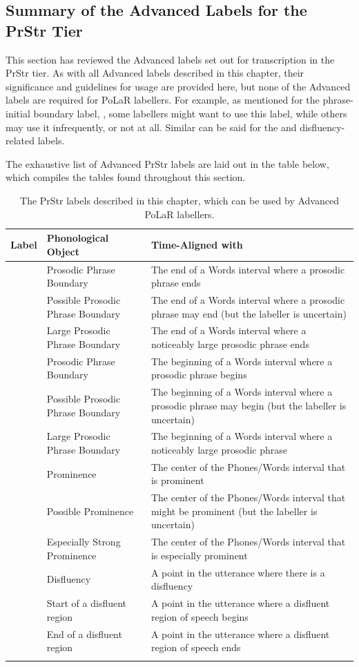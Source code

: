 \documentclass[11pt, twoside]{memoir}
\def\textlabel#1{{\relsize{-.5}\fontspec[Mapping=tex-text]{Roboto Mono}{#1}}}
\begin{document}
\subsection{Summary of the Advanced Labels for the PrStr Tier}
This section has reviewed the Advanced labels set out for transcription in the PrStr tier. As with all Advanced labels described in this chapter, their significance and guidelines for usage are provided here, but none of the Advanced labels are required for PoLaR labellers. For example, as mentioned for the phrase-initial boundary label, \textlabel{[}, some labellers might want to use this label, while others may use it infrequently, or not at all. Similar can be said for the \textlabel{**} and disfluency-related labels.

The exhaustive list of Advanced PrStr labels are laid out in the table below, which compiles the tables found throughout this section.

\begin{longtable}{cp{.3\linewidth}p{.45\linewidth}}
	\toprule
	\textbf{Label} & \textbf{Phonological Object} & \textbf{Time-Aligned with} \tabularnewline
	\midrule
	\endhead
	\rowcolor{green}
	\textlabel{]} & Prosodic Phrase Boundary & The end of a Words interval where a prosodic phrase ends \tabularnewline
	\textlabel{?]} & Possible Prosodic Phrase Boundary & The end of a Words interval where a prosodic phrase may end (but the labeller is uncertain) \tabularnewline
	\textlabel{]]} & Large Prosodic Phrase Boundary & The end of a Words interval where a noticeably large prosodic phrase ends \tabularnewline
	\textlabel{[} & Prosodic Phrase Boundary & The beginning of a Words interval where a prosodic phrase begins \tabularnewline
	\textlabel{?[} & Possible Prosodic Phrase Boundary & The beginning of a Words interval where a prosodic phrase may begin (but the labeller is uncertain) \tabularnewline
	\textlabel{[[} & Large Prosodic Phrase Boundary & The beginning of a Words interval where a noticeably large prosodic phrase \tabularnewline
	\hline
	\rowcolor{green}
	\textlabel{*} & Prominence & The center of the Phones\slash Words interval that is prominent\tabularnewline
	\textlabel{?*} & Possible Prominence & The center of the Phones\slash Words interval that might be prominent (but the labeller is uncertain) \tabularnewline
	\textlabel{**} & Especially Strong Prominence & The center of the Phones\slash Words interval that is especially prominent \tabularnewline
	\hline
	\textlabel{d} & Disfluency & A point in the utterance where there is a disfluency\tabularnewline
	\textlabel{\{d} & Start of a disfluent region & A point in the utterance where a disfluent region of speech begins\tabularnewline
	\textlabel{d\}} & End of a disfluent region & A point in the utterance where a disfluent region of speech ends\tabularnewline
	\bottomrule
	\caption{The PrStr labels described in this chapter, which can be used by Advanced PoLaR labellers.}
\end{longtable}
\end{document}
